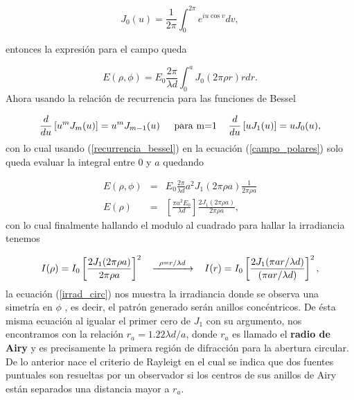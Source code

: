 \begin{itemize}
    \begin{equation}
        J_0(u)=\frac{1}{2\pi}\int_{0}^{2\pi}e^{i u \cos{v}}dv,
    \end{equation}
    
    entonces la expresión para el campo queda
    
    \begin{equation}\label{campo_polares}
        E(\rho,\phi) = E_0 \frac{2\pi}{\lambda d} \int_{0}^{a} J_0(2\pi \rho r)rdr.
    \end{equation}
    Ahora usando la relación de recurrencia para las funciones de Bessel
    
    \begin{equation}\label{recurrencia_bessel}
        \frac{d}{du}\left[u^m J_m(u)\right]=u^m J_{m-1}(u) \hspace{4mm}\text{ para m=1  }\hspace{3mm} \frac{d}{du}\left[u J_1(u)\right]=u J_{0}(u),
    \end{equation}
    con lo cual usando (\ref{recurrencia_bessel}) en la ecuación (\ref{campo_polares}) solo queda evaluar la integral entre $0$ y $a$ quedando
    
    \begin{eqnarray}
        E(\rho,\phi)&=& E_0\frac{2\pi}{\lambda d} a^2 J_1(2\pi \rho a)\frac{1}{2\pi \rho a}\\
        E(\rho)&=& \left[ \frac{\pi a^2 E_0}{\lambda d}\right]\frac{2J_1(2\pi \rho a)}{2\pi \rho a},
    \end{eqnarray}
    con lo cual finalmente hallando el modulo al cuadrado para hallar la irradiancia tenemos
    
    \begin{equation}\label{irrad_circ}
        I(\rho)=I_0\left[\frac{2J_1(2\pi \rho a)}{2\pi \rho a}\right]^2  \hspace{3mm} \xrightarrow{\;\; \rho=r/\lambda d \;\; } \hspace{3mm}  I(r)=I_0\left[\frac{2J_1(\pi ar/\lambda d)}{(\pi ar/\lambda d)}\right]^2,
    \end{equation}
    la ecuación (\ref{irrad_circ}) nos muestra la irradiancia donde se observa una simetría en $\phi$ , es decir, el patrón generado serán anillos concéntricos. De ésta misma ecuación al igualar el primer cero de $J_1$ con su argumento, nos encontramos con la relación $r_a=1.22 \lambda d /a$, donde $r_a$ es llamado el \textbf{radio de Airy} y es precisamente la primera región de difracción para la abertura circular.\\
    De lo anterior nace el criterio de Rayleigt en el cual se indica que dos fuentes puntuales son resueltas por un observador si los centros de sus anillos de Airy están separados una distancia mayor a $r_a$.
\end{itemize}


